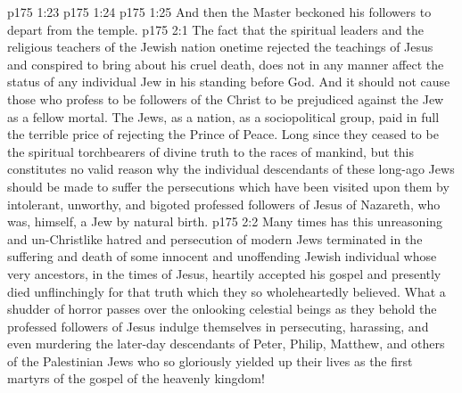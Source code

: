 \vs p175 1:23 
\vs p175 1:24 
\vs p175 1:25 And then the Master beckoned his followers to depart from the temple.
\vs p175 2:1 The fact that the spiritual leaders and the religious teachers of the Jewish nation onetime rejected the teachings of Jesus and conspired to bring about his cruel death, does not in any manner affect the status of any individual Jew in his standing before God. And it should not cause those who profess to be followers of the Christ to be prejudiced against the Jew as a fellow mortal. The Jews, as a nation, as a sociopolitical group, paid in full the terrible price of rejecting the Prince of Peace. Long since they ceased to be the spiritual torchbearers of divine truth to the races of mankind, but this constitutes no valid reason why the individual descendants of these long\hyp{}ago Jews should be made to suffer the persecutions which have been visited upon them by intolerant, unworthy, and bigoted professed followers of Jesus of Nazareth, who was, himself, a Jew by natural birth.
\vs p175 2:2 Many times has this unreasoning and un\hyp{}Christlike hatred and persecution of modern Jews terminated in the suffering and death of some innocent and unoffending Jewish individual whose very ancestors, in the times of Jesus, heartily accepted his gospel and presently died unflinchingly for that truth which they so wholeheartedly believed. What a shudder of horror passes over the onlooking celestial beings as they behold the professed followers of Jesus indulge themselves in persecuting, harassing, and even murdering the later\hyp{}day descendants of Peter, Philip, Matthew, and others of the Palestinian Jews who so gloriously yielded up their lives as the first martyrs of the gospel of the heavenly kingdom!
